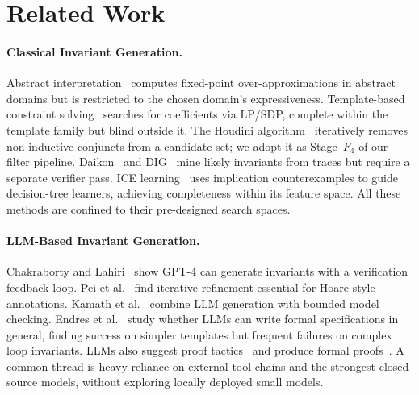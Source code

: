 \section{Related Work}\label{sec:related}

\paragraph{Classical Invariant Generation.}
Abstract interpretation~\citep{cousot1977abstract} computes fixed-point
over-approximations in abstract domains but is restricted to the
chosen domain's expressiveness.
Template-based constraint
solving~\citep{colon2003linear,sankaranarayanan2004non} searches for
coefficients via LP/SDP, complete within the template family but
blind outside it.
The Houdini algorithm~\citep{flanagan2001houdini} iteratively removes
non-inductive conjuncts from a candidate set; we adopt it as
Stage~$F_4$ of our filter pipeline.
Daikon~\citep{daikon} and DIG~\citep{nguyen2012using} mine likely
invariants from traces but require a separate verifier pass.
ICE learning~\citep{garg2016learning} uses implication counterexamples
to guide decision-tree learners, achieving completeness within its
feature space.
All these methods are confined to their pre-designed search spaces.

\paragraph{LLM-Based Invariant Generation.}
Chakraborty and Lahiri~\citep{chakraborty2024towards} show GPT-4 can
generate invariants with a verification feedback loop.
Pei et al.~\citep{pei2023can} find iterative refinement essential for
Hoare-style annotations.
Kamath et al.~\citep{kamath2023finding} combine LLM generation with
bounded model checking.
Endres et al.~\citep{endres2024can} study whether LLMs can write
formal specifications in general, finding success on simpler
templates but frequent failures on complex loop invariants.
LLMs also suggest proof tactics~\citep{han2021proof,jiang2022draft} and
produce formal
proofs~\citep{wu2022autoformalization,lample2022hypertree,polu2022formal}.
A common thread is heavy reliance on external tool chains and the
strongest closed-source models, without exploring locally deployed
small models.

